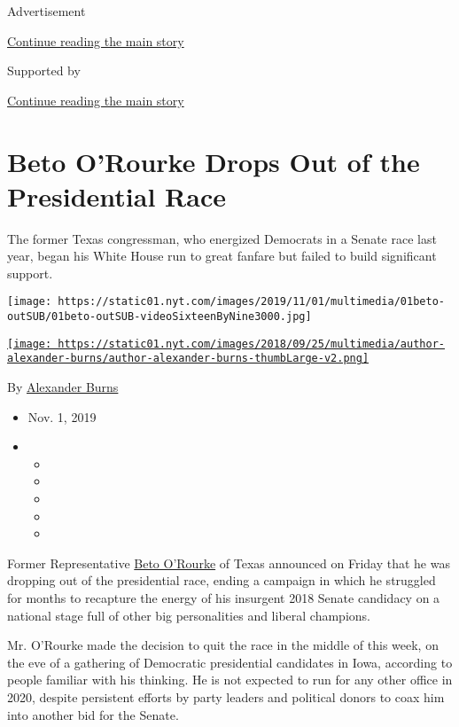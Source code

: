 Advertisement

\protect\hyperlink{after-top}{Continue reading the main story}

Supported by

\protect\hyperlink{after-sponsor}{Continue reading the main story}

\hypertarget{beto-orourke-drops-out-of-the-presidential-race}{%
\section{Beto O'Rourke Drops Out of the Presidential
Race}\label{beto-orourke-drops-out-of-the-presidential-race}}

The former Texas congressman, who energized Democrats in a Senate race
last year, began his White House run to great fanfare but failed to
build significant support.

\texttt{[image: https://static01.nyt.com/images/2019/11/01/multimedia/01beto-outSUB/01beto-outSUB-videoSixteenByNine3000.jpg]}

\href{https://www.nytimes.com/by/alexander-burns}{\texttt{[image: https://static01.nyt.com/images/2018/09/25/multimedia/author-alexander-burns/author-alexander-burns-thumbLarge-v2.png]}}

By \href{https://www.nytimes.com/by/alexander-burns}{Alexander Burns}

\begin{itemize}
\item
  Nov. 1, 2019
\item
  \begin{itemize}
  \item
  \item
  \item
  \item
  \item
  \end{itemize}
\end{itemize}

Former Representative
\href{https://www.nytimes.com/interactive/2020/us/elections/beto-orourke.html}{Beto
O'Rourke} of Texas announced on Friday that he was dropping out of the
presidential race, ending a campaign in which he struggled for months to
recapture the energy of his insurgent 2018 Senate candidacy on a
national stage full of other big personalities and liberal champions.

Mr. O'Rourke made the decision to quit the race in the middle of this
week, on the eve of a gathering of Democratic presidential candidates in
Iowa, according to people familiar with his thinking. He is not expected
to run for any other office in 2020, despite persistent efforts by party
leaders and political donors to coax him into another bid for the
Senate.

